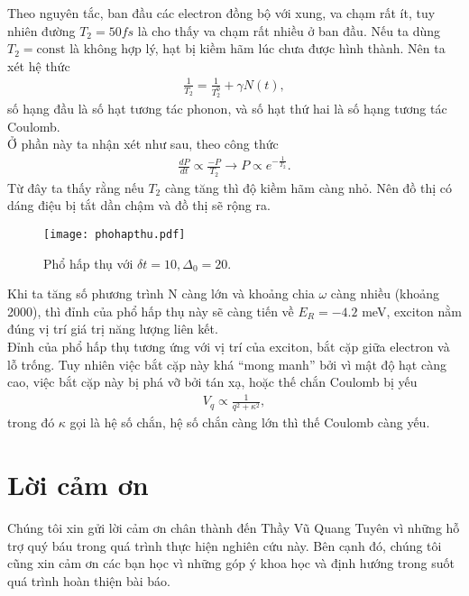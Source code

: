 \documentclass[%
reprint,
amsmath,amssymb,
superscriptaddress,
aps,
]{revtex4-2}
\begin{document}
Theo nguyên tắc, ban đầu các electron đồng bộ với xung, va chạm rất ít, tuy nhiên đường $T_2 = 50 fs$ là cho thấy va chạm rất nhiều ở ban đầu. Nếu ta dùng $T_2 = \text{const}$ là không hợp lý, hạt bị kiềm hãm lúc chưa được hình thành. Nên ta xét hệ thức
\begin{gather}
	\frac{1}{T_2} = \frac{1}{T_2^0} + \gamma N(t),
\end{gather}
số hạng đầu là số hạt tương tác phonon, và số hạt thứ hai là số hạng tương tác Coulomb.\\
Ở phần này ta nhận xét như sau, theo công thức 
\begin{gather}
	\frac{dP}{dt} \propto \frac{-P}{T_2} \rightarrow P \propto e^{-\frac{1}{T_2}}.
\end{gather}
Từ đây ta thấy rằng nếu $T_2$ càng tăng thì độ kiềm hãm càng nhỏ. Nên đồ thị có dáng điệu bị tắt dần chậm và đồ thị sẽ rộng ra.
\begin{figure}[H]
	\centering
	\texttt{[image: phohapthu.pdf]}
	\caption{Phổ hấp thụ với $\delta t = 10, \Delta_{0} = 20$.}
	\label{fig:pho hap thu}
\end{figure}

Khi ta tăng số phương trình N càng lớn và khoảng chia $\omega$ càng nhiều (khoảng 2000), thì đỉnh của phổ hấp thụ này sẽ càng tiến về $E_R = -4.2$ meV, exciton nằm đúng vị trí giá trị năng lượng liên kết.\\
Đỉnh của phổ hấp thụ tương ứng với vị trí của exciton, bắt cặp giữa electron và lỗ trống. Tuy nhiên việc bắt cặp này khá ``mong manh'' bởi vì mật độ hạt càng cao, việc bắt cặp này bị phá vỡ bởi tán xạ, hoặc thế chắn Coulomb bị yếu 
\begin{equation}
	\begin{aligned}
		V_q \propto \frac{1}{q^2 + \kappa^2},
	\end{aligned}
\end{equation}
trong đó $\kappa$ gọi là hệ số chắn, hệ số chắn càng lớn thì thế Coulomb càng yếu.

\section*{Lời cảm ơn}
Chúng tôi xin gửi lời cảm ơn chân thành đến Thầy Vũ Quang Tuyên vì những hỗ trợ quý báu trong quá trình thực hiện nghiên cứu này. Bên cạnh đó, chúng tôi cũng xin cảm ơn các bạn học vì những góp ý khoa học và định hướng trong suốt quá trình hoàn thiện bài báo.
\end{document}
